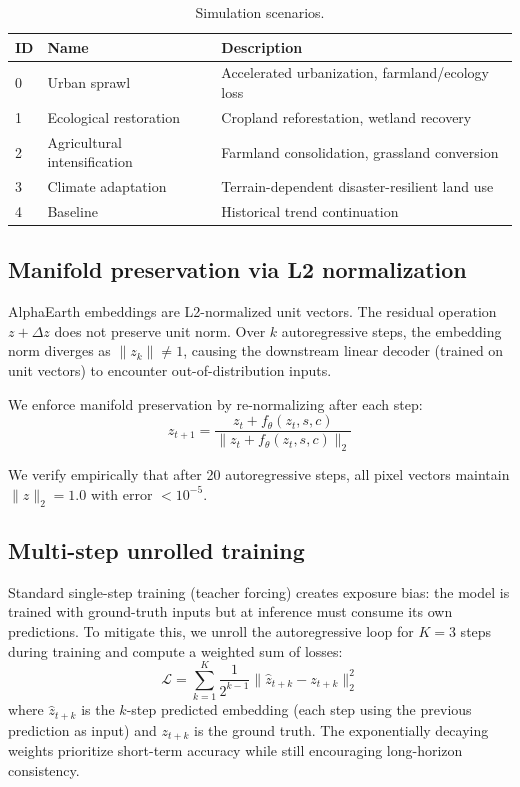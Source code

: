 \documentclass{article}
\begin{document}
\begin{table}[htbp]
\centering
\caption{Simulation scenarios.}
\label{tab:scenarios}
\begin{tabular}{lll}
\toprule
ID & Name & Description \\
\midrule
0 & Urban sprawl & Accelerated urbanization, farmland/ecology loss \\
1 & Ecological restoration & Cropland reforestation, wetland recovery \\
2 & Agricultural intensification & Farmland consolidation, grassland conversion \\
3 & Climate adaptation & Terrain-dependent disaster-resilient land use \\
4 & Baseline & Historical trend continuation \\
\bottomrule
\end{tabular}
\end{table}

\subsection{Manifold preservation via L2 normalization}
\label{sec:manifold}

AlphaEarth embeddings are L2-normalized unit vectors. The residual operation $z + \Delta z$ does not preserve unit norm. Over $k$ autoregressive steps, the embedding norm diverges as $\|z_k\| \neq 1$, causing the downstream linear decoder (trained on unit vectors) to encounter out-of-distribution inputs.

We enforce manifold preservation by re-normalizing after each step:
\begin{equation}
z_{t+1} = \frac{z_t + f_\theta(z_t, s, c)}{\|z_t + f_\theta(z_t, s, c)\|_2}
\end{equation}

We verify empirically that after 20 autoregressive steps, all pixel vectors maintain $\|z\|_2 = 1.0$ with error $<10^{-5}$.

\subsection{Multi-step unrolled training}
\label{sec:multistep}

Standard single-step training (teacher forcing) creates exposure bias: the model is trained with ground-truth inputs but at inference must consume its own predictions. To mitigate this, we unroll the autoregressive loop for $K=3$ steps during training and compute a weighted sum of losses:
\begin{equation}
\mathcal{L} = \sum_{k=1}^{K} \frac{1}{2^{k-1}} \|\hat{z}_{t+k} - z_{t+k}\|_2^2
\end{equation}
where $\hat{z}_{t+k}$ is the $k$-step predicted embedding (each step using the previous prediction as input) and $z_{t+k}$ is the ground truth. The exponentially decaying weights prioritize short-term accuracy while still encouraging long-horizon consistency.
\end{document}
